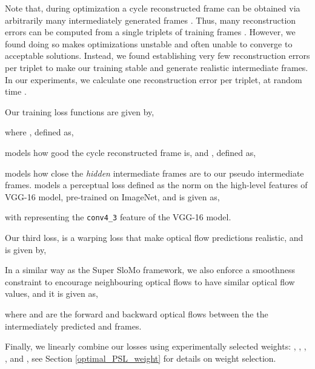 \documentclass[10pt,twocolumn,letterpaper]{article}
\begin{document}
Note that, during optimization a cycle reconstructed frame  can be obtained via arbitrarily many intermediately generated frames . Thus, many reconstruction errors can be computed from a single triplets of training frames . However, we found doing so makes  optimizations unstable and often unable to converge to acceptable solutions. Instead, we found establishing very few reconstruction errors per triplet to make our training stable and generate realistic intermediate frames. In our experiments, we calculate one reconstruction error per triplet, at random time . 

Our training loss functions are given by, 

where , defined as, 

models how good the cycle reconstructed frame is, and , defined as, 



 models how close the \textit{hidden} intermediate frames are to our pseudo intermediate frames.  models a perceptual loss defined as the  norm on the high-level features of VGG-16 model, pre-trained on ImageNet, and is given as, 

with  representing the \texttt{conv4\_3} feature of the VGG-16 model.

Our third loss,  is a warping loss that make optical flow predictions realistic, and is given by, 


In a similar way as the Super SloMo framework, we also enforce a smoothness constraint to encourage neighbouring optical flows to have similar optical flow values, and it is given as, 

where  and  are the forward and backward optical flows between the the intermediately predicted  and  frames.

Finally, we linearly combine our losses using experimentally selected weights: , , , , and , see Section \ref{optimal_PSL_weight} for details on weight selection. 
\end{document}
